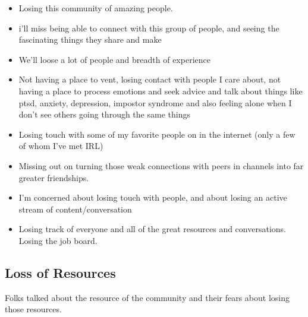\documentclass[
]{book}
\begin{document}
\begin{itemize}
\item
  Losing this community of amazing people.
\item
  i'll miss being able to connect with this group of people, and seeing the fascinating things they share and make
\item
  We'll loose a lot of people and breadth of experience
\item
  Not having a place to vent, losing contact with people I care about, not having a place to process emotions and seek advice and talk about things like ptsd, anxiety, depression, impostor syndrome and also feeling alone when I don't see others going through the same things
\item
  Losing touch with some of my favorite people on in the internet (only a few of whom I've met IRL)
\item
  Missing out on turning those weak connections with peers in channels into far greater friendships.
\item
  I'm concerned about losing touch with people, and about losing an active stream of content/conversation
\item
  Losing track of everyone and all of the great resources and conversations. Losing the job board.
\end{itemize}

\subsection{Loss of Resources}\label{loss-of-resources}

Folks talked about the resource of the community and their fears about losing those resources.
\end{document}
